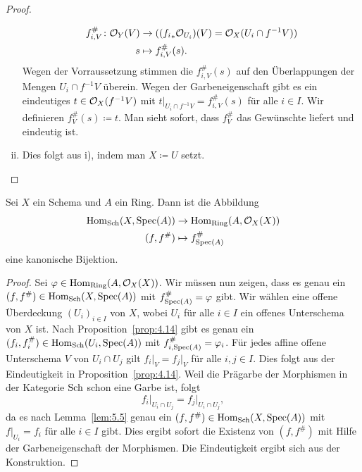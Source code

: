 \begin{lem}
\begin{proof}
\begin{enumerate}[i)]
			\begin{align*}
				f_{i,V}^{\#}\colon \mathcal{O}_Y(V)&\to (({f_i}_*\mathcal{O}_{U_i})(V) = \mathcal{O}_X(U_i \cap f^{-1}V))\\
				s &\mapsto f^{\#}_{i,V}(s).
			\end{align*}
			Wegen der Vorraussetzung stimmen die $f_{i,V}^{\#}(s)$ auf den Überlappungen der Mengen $U_i\cap f^{-1}V$ überein. Wegen der Garbeneigenschaft gibt es ein eindeutiges $t \in \mathcal{O}_X(f^{-1}V)$ mit $t\vert_{U_i\cap f^{-1}V} = f_{i,V}^{\#}(s)$ für alle $i \in I$. Wir definieren $f^{\#}_V(s) \coloneqq t$. Man sieht sofort, dass $f_V^{\#}$ das Gewünschte liefert und eindeutig ist.
			\item Dies folgt aus i), indem man $X \coloneqq U$ setzt.
		\end{enumerate}
	\end{proof}
\end{lem}

\begin{prop}
\label{prop:5.6}
	Sei $X$ ein Schema und $A$ ein Ring. Dann ist die Abbildung
	\begin{align*}
		\operatorname{Hom}_{\operatorname{Sch}}(X,\operatorname{Spec}(A)) &\to \operatorname{Hom}_{\operatorname{Ring}}(A,\mathcal{O}_X(X))\\
		(f,f^{\#}) & \mapsto f^{\#}_{\operatorname{Spec}(A)}
	\end{align*}
	eine kanonische Bijektion.
	\begin{proof}
		Sei $\varphi\in \operatorname{Hom}_{\operatorname{Ring}}(A,\mathcal{O}_X(X))$. Wir müssen nun zeigen, dass es genau ein $(f,f^{\#}) \in \operatorname{Hom}_{\operatorname{Sch}}(X,\operatorname{Spec}(A))$ mit $f^{\#}_{\operatorname{Spec}(A)} = \varphi$ gibt. Wir wählen eine offene Überdeckung $(U_i)_{i\in I}$ von $X$, wobei $U_i$ für alle $i \in I$ ein offenes Unterschema von $X$ ist. Nach Proposition~\ref{prop:4.14} gibt es genau ein $(f_i,f_i^{\#}) \in \operatorname{Hom}_{\operatorname{Sch}}(U_i,\operatorname{Spec}(A))$ mit $f^{\#}_{i,\operatorname{Spec}(A)} = \varphi_i$. Für jedes affine offene Unterschema $V$ von $U_i \cap U_j$ gilt $f_i\vert_V = f_j\vert_V$ für alle $i,j \in I$. Dies folgt aus der Eindeutigkeit in Proposition~\ref{prop:4.14}. Weil die Prägarbe der Morphismen in der Kategorie $\operatorname{Sch}$ schon eine Garbe ist, folgt
		\[
			f_i\vert_{U_i\cap U_j} = f_j\vert_{U_i\cap U_j},
		\]
		da es nach Lemma~\ref{lem:5.5} genau ein $(f,f^{\#}) \in \operatorname{Hom}_{\operatorname{Sch}}(X,\operatorname{Spec}(A))$ mit $f\vert_{U_i} = f_i$ für alle $i \in I$ gibt. Dies ergibt sofort die Existenz von $(f,f^{\#})$ mit Hilfe der Garbeneigenschaft der Morphismen. Die Eindeutigkeit ergibt sich aus der Konstruktion.
	\end{proof}
\end{prop}

